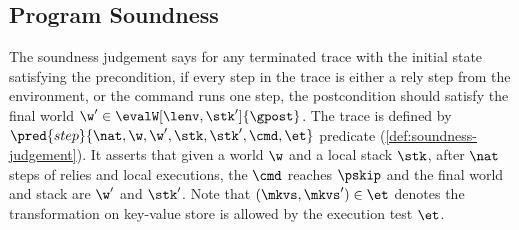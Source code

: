 \subsection{Program Soundness}

The soundness judgement says for any terminated trace with the initial state satisfying the precondition, if every step in the trace is either a rely step from the environment,
or the command runs one step, the postcondition should satisfy the final world \( \w' \in \evalW[\lenv,\stk']{\gpost} \).
The trace is defined by \( \pred{step}{\nat, \w, \w', \stk, \stk', \cmd, \et} \) predicate (\cref{def:soundness-judgement}).
It asserts that given a world \( \w \) and a local stack \( \stk \), after \( \nat \) steps of relies and local executions, the \( \cmd \) reaches \( \pskip \) and the final world and stack are \( \w'\) and \( \stk' \).
Note that \( (\mkvs, \mkvs') \in \et \) denotes the transformation on key-value store is allowed by the execution test \( \et \).

